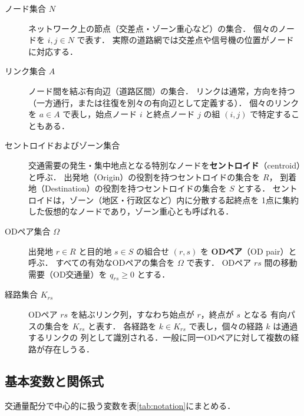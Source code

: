 \begin{description}
  \item[ノード集合 $N$]
    ネットワーク上の節点（交差点・ゾーン重心など）の集合．
    個々のノードを $i, j \in N$ で表す．
    実際の道路網では交差点や信号機の位置がノードに対応する．

  \item[リンク集合 $A$]
    ノード間を結ぶ有向辺（道路区間）の集合．
    リンクは通常，方向を持つ（一方通行，または往復を別々の有向辺として定義する）．
    個々のリンクを $a \in A$ で表し，始点ノード $i$ と終点ノード $j$ の組
    $(i, j)$ で特定することもある．

  \item[セントロイドおよびゾーン集合]
    交通需要の発生・集中地点となる特別なノードを\textbf{セントロイド}（centroid）と呼ぶ．
    出発地（Origin）の役割を持つセントロイドの集合を $R$，
    到着地（Destination）の役割を持つセントロイドの集合を $S$ とする．
    セントロイドは，ゾーン（地区・行政区など）内に分散する起終点を
    1点に集約した仮想的なノードであり，ゾーン重心とも呼ばれる．

  \item[ODペア集合 $\Omega$]
    出発地 $r \in R$ と目的地 $s \in S$ の組合せ $(r, s)$ を
    \textbf{ODペア}（OD pair）と呼ぶ．
    すべての有効なODペアの集合を $\Omega$ で表す．
    ODペア $rs$ 間の移動需要（OD交通量）を $q_{rs} \geq 0$ とする．

  \item[経路集合 $K_{rs}$]
    ODペア $rs$ を結ぶリンク列，すなわち始点が $r$，終点が $s$ となる
    有向パスの集合を $K_{rs}$ と表す．
    各経路を $k \in K_{rs}$ で表し，個々の経路 $k$ は通過するリンクの
    列として識別される．一般に同一ODペアに対して複数の経路が存在しうる．
\end{description}

\subsection{基本変数と関係式}
\label{subsec:basic-variables}

交通量配分で中心的に扱う変数を表\ref{tab:notation}にまとめる．

